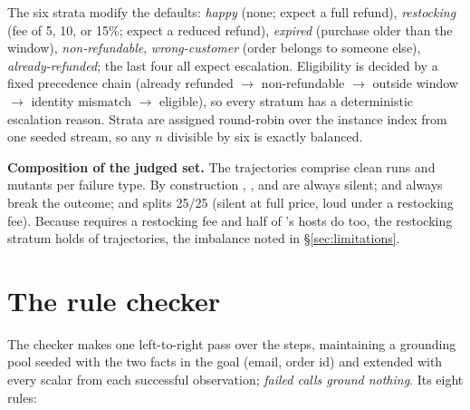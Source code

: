 The six strata modify the defaults: \emph{happy} (none; expect a full refund),
\emph{restocking} (fee of 5, 10, or 15\%; expect a reduced refund), \emph{expired} (purchase
older than the window), \emph{non-refundable}, \emph{wrong-customer} (order belongs to
someone else), \emph{already-refunded}; the last four all expect escalation. Eligibility is
decided by a fixed precedence chain (already refunded $\to$ non-refundable $\to$ outside
window $\to$ identity mismatch $\to$ eligible), so every stratum has a deterministic
escalation reason. Strata are assigned round-robin over the instance index from one seeded
stream, so any $n$ divisible by six is exactly balanced.

\textbf{Composition of the judged set.} The \tjNTraj{} trajectories comprise \tjNClean{}
clean runs and \tjNPerType{} mutants per failure type. By construction ,
, and  are always silent;
 and  always break the outcome; and
 splits 25/25 (silent at full price, loud under a restocking
fee). Because  requires a restocking fee and half of
's hosts do too, the restocking stratum holds \tjNRestocking{}
of \tjNTraj{} trajectories, the imbalance noted in \S\ref{sec:limitations}.

\section{The rule checker}
\label{app:checker}

The checker makes one left-to-right pass over the steps, maintaining a grounding pool seeded
with the two facts in the goal (email, order id) and extended with every scalar from each
successful observation; \emph{failed calls ground nothing}. Its eight rules:

